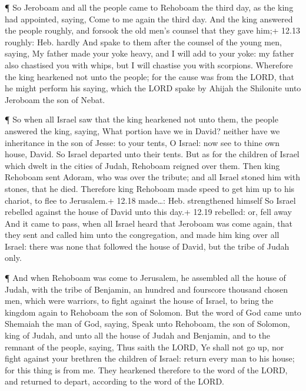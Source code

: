  ¶ So Jeroboam and all the people came to Rehoboam the
third day, as the king had appointed, saying, Come to me again the third
day.  And the king answered the people roughly, and forsook
the old men's counsel that they gave him;+ 12.13 roughly: Heb. hardly
 And spake to them after the counsel of the young men,
saying, My father made your yoke heavy, and I will add to your yoke: my
father also chastised you with whips, but I will chastise you with
scorpions.  Wherefore the king hearkened not unto the
people; for the cause was from the LORD, that he might perform his
saying, which the LORD spake by Ahijah the Shilonite unto Jeroboam the
son of Nebat.

 ¶ So when all Israel saw that the king hearkened not unto
them, the people answered the king, saying, What portion have we in
David? neither have we inheritance in the son of Jesse: to your tents, O
Israel: now see to thine own house, David. So Israel departed unto their
tents.  But as for the children of Israel which dwelt in
the cities of Judah, Rehoboam reigned over them.  Then king
Rehoboam sent Adoram, who was over the tribute; and all Israel stoned
him with stones, that he died. Therefore king Rehoboam made speed to get
him up to his chariot, to flee to Jerusalem.+ 12.18 made\ldots: Heb.
strengthened himself  So Israel rebelled against the house
of David unto this day.+ 12.19 rebelled: or, fell away  And
it came to pass, when all Israel heard that Jeroboam was come again,
that they sent and called him unto the congregation, and made him king
over all Israel: there was none that followed the house of David, but
the tribe of Judah only.

 ¶ And when Rehoboam was come to Jerusalem, he assembled
all the house of Judah, with the tribe of Benjamin, an hundred and
fourscore thousand chosen men, which were warriors, to fight against the
house of Israel, to bring the kingdom again to Rehoboam the son of
Solomon.  But the word of God came unto Shemaiah the man of
God, saying,  Speak unto Rehoboam, the son of Solomon, king
of Judah, and unto all the house of Judah and Benjamin, and to the
remnant of the people, saying,  Thus saith the LORD, Ye
shall not go up, nor fight against your brethren the children of Israel:
return every man to his house; for this thing is from me. They hearkened
therefore to the word of the LORD, and returned to depart, according to
the word of the LORD.

